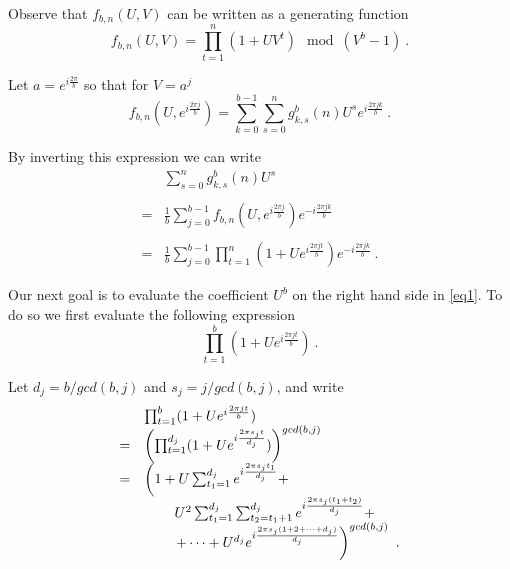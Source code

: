 Observe that $f_{b,n}(U,V)$ can be written as a generating function
\begin{equation}\label{eq1a}
f_{b,n}(U,V)= \prod_{t=1}^n (1+UV^t) \mod (V^b-1)~.
\end{equation}


Let $a=e^{i\frac{2\pi }{b}}$ so that for $V=a^j$
\begin{equation}\label{eq1b}
f_{b,n}(U,e^{i\frac{2\pi j}{b}})= \sum_{k=0}^{b-1} \sum_{s=0}^n
g^b_{k,s}(n)U^s e^{i\frac{2\pi jk}{b}}~.
\end{equation}

By inverting this expression we can write
\begin{equation}\label{eq1}
\begin{array}{lll}
&\sum_{s=0}^n g^b_{k,s}(n)U^s \\ \\=& \frac{1}{b}
\sum_{j=0}^{b-1}f_{b,n}(U,e^{i\frac{2\pi j}{b}}) e^{-i\frac{2\pi
jk}{b}}\\ \\=& \frac{1}{b} \sum_{j=0}^{b-1} \prod_{t=1}^n
(1+Ue^{i\frac{2\pi jt}{b}}) e^{-i\frac{2\pi jk}{b}}~.
\end{array}
\end{equation}

Our next goal is to evaluate the coefficient $U^b$ on the right hand
side in \eqref{eq1}. To do so we first evaluate the following
expression
\begin{equation}
\prod_{t=1}^b (1+Ue^{i\frac{2\pi jt}{b}})~.
\end{equation}

Let $d_j=b/gcd(b,j)$ and $s_j=j/gcd(b,j)$, and write
\begin{equation}
\begin{array}{lll}
{}&\prod_{t=1}^b (1+Ue^{i\frac{2\pi jt}{b}})\\=&
\left(\prod_{t=1}^{d_j} (1+Ue^{i\frac{2\pi
s_j t}{d_j}})\right)^{gcd(b,j)}\\
=& \left( 1+ U\sum_{t_1=1}^{d_j} e^{i\frac{2\pi s_j t_1}{d_j}}+
\right.
\\{}&\hspace{0.3in}U^2\sum_{t_1=1}^{d_j}\sum_{t_2=t_1+1}^{d_j}
e^{i\frac{2\pi s_j(t_1+t_2)}{d_j}} +\\{}&\left.\hspace{0.3in}+\dots
+ U^{d_j} e^{i\frac{2\pi s_j
(1+2+\dots+d_j)}{d_j}}\right)^{gcd(b,j)}~.
\end{array}
\end{equation}


